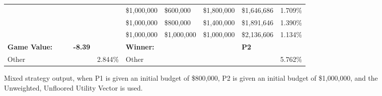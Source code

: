 \documentclass[11pt]{article}
\begin{document}
\begin{figure}
\begin{tabular}{ |p{1.0cm}p{1.0cm}p{1.0cm}p{2.0cm}|p{1.0cm}||p{1.0cm}p{1.0cm}p{1.0cm}p{2.0cm}|p{1.0cm}|}
& & & & & \$1,000,000 & \$600,000 & \$1,800,000 & \$1,646,686 & 1.709\% \\
& & & & & \$1,000,000 & \$800,000 & \$1,400,000 & \$1,891,646 & 1.390\% \\
& & & & & \$1,000,000 & \$1,000,000 & \$1,000,000 & \$2,136,606 & 1.134\% \\
\hline
\small \textbf{Game Value:} &&& \small \textbf{-8.39} && \small \textbf{Winner:} &&& \small \textbf{P2}&\\
\hline
Other& & & & 2.844\% & Other& & & & 5.762\% \\
\hline
\end{tabular}
\caption{Mixed strategy output, when P1 is given an initial budget of \$800,000, P2 is given an initial budget of \$1,000,000, and the Unweighted, Unfloored Utility Vector is used.}
\label{8v10table.4}
\end{figure}
\end{document}
